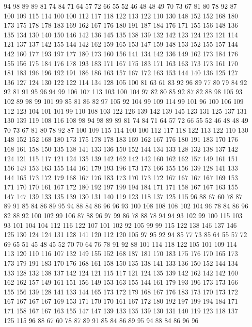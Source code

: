 94 98 89 89 81 74 84 71 64 57 72 66 55 52 46 48 48 49 70 73
67 81 80 78 92 87 100 109 115 114 100 100 112 117 118 122 113 122 110 130
148 152 152 168 180 173 175 178 178 183 169 162 167 176 180 191 187 184 176 171
155 156 148 136 135 134 130 140 150 146 142 136 145 135 138 139 132 142 123 124
123 121 114 121 137 137 142 155 144 142 162 159 165 153 147 159 148 153 152 155
157 144 142 160 177 193 197 177 180 173 160 156 141 134 142 136 149 162 173 184
176 155 156 175 184 176 178 193 183 171 167 175 183 171 163 163 173 173 161 170
181 183 196 196 192 191 186 186 163 157 167 172 163 153 144 140 136 125 127 136
127 124 130 122 122 114 134 128 105 100 81 63 61 83 92 96 89 77 80 79
84 92 92 81 91 95 96 94 99 106 107 113 103 100 104 97 82 80 85 92
87 82 88 98 105 93 102 89 98 99 101 99 85 81 86 82 97 105 92 104
99 109 114 99 101 96 100 106 109 112 123 104 101 101 99 110 108 103 122 126
139 142 139 145 123 131 125 137 131 130 139 119 108 116 108 98 94 98 89 89
81 74 84 71 64 57 72 66 55 52 46 48 48 49 70 73 67 81 80 78
92 87 100 109 115 114 100 100 112 117 118 122 113 122 110 130 148 152 152 168
180 173 175 178 178 183 169 162 167 176 180 191 183 170 176 168 161 158 150 135
138 141 133 136 150 152 144 134 133 128 132 138 137 142 124 121 115 117 121 124
135 139 142 162 142 142 160 162 162 157 149 161 151 156 149 153 163 155 144 161
179 193 196 173 173 166 155 156 139 128 141 133 144 165 173 172 179 168 167 176
183 173 170 173 172 167 167 167 167 169 153 171 170 170 161 167 172 180 192 197
199 194 184 171 171 158 167 167 163 155 147 147 139 133 135 139 130 131 140 119
123 118 137 125 115 96 88 67 60 78 87 89 91 85 84 86 89 95 94 88
84 86 96 96 93 100 108 108 108 102 104 96 78 84 86 96 82 88 92 100
102 99 106 87 88 96 97 99 86 78 88 78 94 94 93 102 99 100 115 103
93 101 104 104 112 116 122 107 101 102 92 105 99 99 115 122 138 146 137 146
125 130 124 124 131 128 141 120 112 120 105 97 95 92 94 85 77 73 85 64
55 57 72 69 65 51 45 48 45 52 70 70 64 76 78 91 92 88 101 114
118 122 105 101 109 114 113 120 110 116 107 132 149 155 152 168 187 181 170 183
175 176 170 165 173 173 179 191 183 170 176 168 161 158 150 135 138 141 133 136
150 152 144 134 133 128 132 138 137 142 124 121 115 117 121 124 135 139 142 162
142 142 160 162 162 157 149 161 151 156 149 153 163 155 144 161 179 193 196 173
173 166 155 156 139 128 141 133 144 165 173 172 179 168 167 176 183 173 170 173
172 167 167 167 167 169 153 171 170 170 161 167 172 180 192 197 199 194 184 171
171 158 167 167 163 155 147 147 139 133 135 139 130 131 140 119 123 118 137 125
115 96 88 67 60 78 87 89 91 85 84 86 89 95 94 88 84 86 96 96
